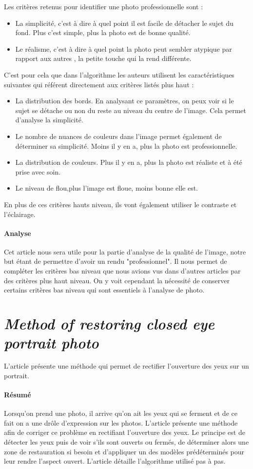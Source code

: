 \documentclass[11pt, french]{report-rd-info}
\begin{document}
Les critères retenus pour identifier une photo professionnelle sont :
\begin{itemize}
\item La simplicité, c'est à dire à quel point il est facile de détacher le sujet du fond. Plus c'est simple, plus la photo est de bonne qualité.
\item Le réalisme, c'est à dire à quel point la photo peut sembler atypique par rapport aux autres , la petite touche qui la rend différente.
\end{itemize}
C'est pour cela que dans l'algorithme les auteurs utilisent les caractéristiques suivantes qui référent directement aux critères listés plus haut : 
\begin{itemize}
\item La distribution des bords. En analysant ce paramètres, on peux voir si le sujet se détache ou non du reste au niveau du centre de l'image. Cela permet d'analyse la simplicité.
\item Le nombre de nuances de couleurs dans l'image permet également de déterminer sa simplicité. Moins il y en a, plus la photo est professionnelle.
\item La distribution de couleurs. Plus il y en a, plus la photo est réaliste et à été prise avec soin.
\item Le niveau de flou,plus l'image est floue, moins bonne elle est.
\end{itemize}
En plus de ces critères hauts niveau, ils vont également utiliser le contraste et l'éclairage.


\paragraph{Analyse}
Cet article nous sera utile pour la partie d'analyse de la qualité de l'image, notre but étant de permettre d'avoir un rendu "professionnel". Il nous permet de compléter les critères bas niveau que nous avions vus dans d'autres articles par des critères plus haut niveau. On y voit cependant la nécessité de conserver certains critères bas niveau qui sont essentiels à l'analyse de photo.

\section{\emph{Method of restoring closed eye portrait photo}}
L'article \cite{Li2011} présente une méthode qui permet de rectifier l'ouverture des yeux sur un portrait.

\paragraph{Résumé}
Lorsqu'on prend une photo, il arrive qu'on ait les yeux qui se ferment et de ce fait on a une drôle d'expression sur les photos. L'article présente une méthode afin de corriger ce problème en rectifiant l'ouverture des yeux.
Le principe est de détecter les yeux puis de voir s'ils sont ouverts ou fermés, de déterminer alors une zone de restauration si besoin et d'appliquer un des modèles prédéterminés pour leur rendre l'aspect ouvert.
L'article détaille l'algorithme utilisé pas à pas.
\end{document}
